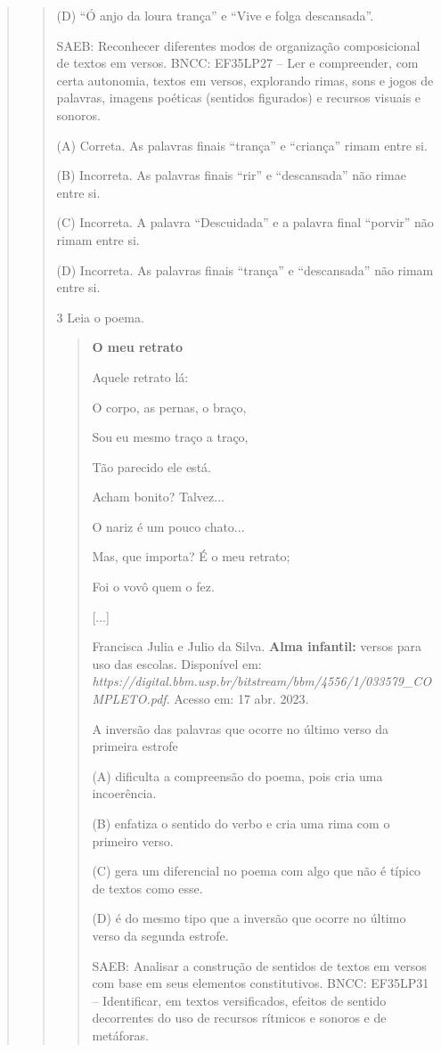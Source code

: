 \begin{boxlist}
{{\begin{quote}
\begin{quote}
(D) ``Ó anjo da loura trança'' e ``Vive e folga descansada''.

SAEB: Reconhecer diferentes modos de organização composicional de textos em versos.
BNCC: EF35LP27 -- Ler e compreender, com certa autonomia, textos em
versos, explorando rimas, sons e jogos de palavras, imagens poéticas
(sentidos figurados) e recursos visuais e sonoros.

(A) Correta. As palavras finais ``trança'' e ``criança'' rimam entre si.

(B) Incorreta. As palavras finais ``rir'' e ``descansada'' não rimae entre si.

(C) Incorreta. A palavra ``Descuidada'' e a palavra final ``porvir'' não rimam entre si.

(D) Incorreta. As palavras finais ``trança'' e ``descansada'' não rimam entre si.

\num{3} Leia o poema.

\begin{quote}
\textbf{O meu retrato}

Aquele retrato lá:

O corpo, as pernas, o braço,

Sou eu mesmo traço a traço,

Tão parecido ele está.


Acham bonito? Talvez...

O nariz é um pouco chato...

Mas, que importa? É o meu retrato;

Foi o vovô quem o fez.

{[}...{]}

Francisca Julia e Julio da Silva. \textbf{Alma infantil:} versos para uso das escolas.
Disponível em: \emph{https://digital.bbm.usp.br/bitstream/bbm/4556/1/033579_COMPLETO.pdf}.
Acesso em: 17 abr. 2023.

A inversão das palavras que ocorre no último verso da primeira estrofe

(A) dificulta a compreensão do poema, pois cria uma incoerência.

(B) enfatiza o sentido do verbo e cria uma rima com o primeiro verso.

(C) gera um diferencial no poema com algo que não é típico de textos como esse.

(D) é do mesmo tipo que a inversão que ocorre no último verso da segunda estrofe.

SAEB: Analisar a construção de sentidos de textos em versos com base em seus elementos constitutivos.
BNCC: EF35LP31 -- Identificar, em textos versificados, efeitos de sentido
decorrentes do uso de recursos rítmicos e sonoros e de metáforas.


\end{quote}
\end{quote}
\end{quote}}}
\end{boxlist}
